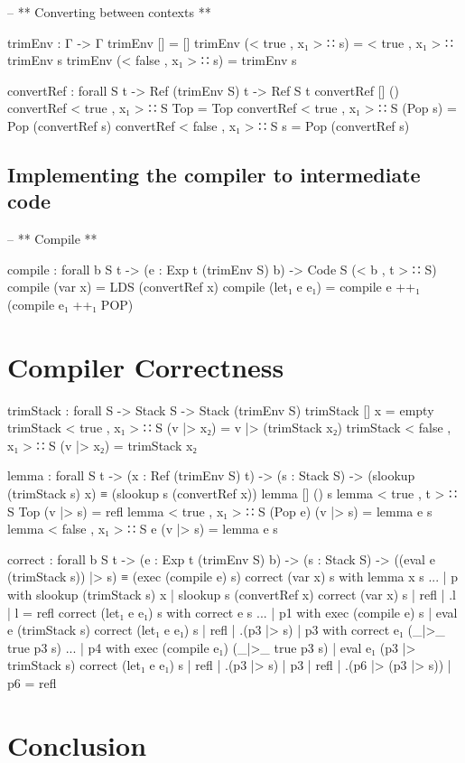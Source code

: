 \documentclass[paper=a4, fontsize=11pt]{scrartcl} %
\numberwithin{equation}{section} %
\numberwithin{figure}{section} %
\numberwithin{table}{section} %
\begin{document}
-- ** Converting between contexts **

trimEnv : Γ -> Γ
trimEnv [] = []
trimEnv (< true , x₁ > ∷ s) = < true , x₁ > ∷ trimEnv s
trimEnv (< false , x₁ > ∷ s) = trimEnv s

convertRef : forall {S t} -> Ref (trimEnv S) t -> Ref S t
convertRef {[]} ()
convertRef {< true , x₁ > ∷ S} Top = Top
convertRef {< true , x₁ > ∷ S} (Pop s) = Pop (convertRef s)
convertRef {< false , x₁ > ∷ S} s = Pop (convertRef s)


\subsection{Implementing the compiler to intermediate code}

-- ** Compile ** 

compile : forall {b S t} -> (e : Exp t (trimEnv S) b) -> Code S (< b , t > ∷ S)
compile (var x) = LDS (convertRef x)
compile (let₁ e e₁) = compile e ++₁ (compile e₁ ++₁ POP)


\section{Compiler Correctness}

trimStack : forall {S} -> Stack S -> Stack (trimEnv S)
trimStack {[]} x = empty
trimStack {< true , x₁ > ∷ S} (v |> x₂) = v |> (trimStack x₂)
trimStack {< false , x₁ > ∷ S} (v |> x₂) = trimStack x₂


lemma : forall {S t} -> (x : Ref (trimEnv S) t) -> (s : Stack S) -> (slookup (trimStack s) x) ≡ (slookup s (convertRef x))
lemma {[]} () s
lemma {< true , t > ∷ S} Top (v |> s) = refl
lemma {< true , x₁ > ∷ S} (Pop e) (v |> s) = lemma e s
lemma {< false , x₁ > ∷ S} e (v |> s) = lemma e s

correct : forall {b S t} -> (e : Exp t (trimEnv S) b) -> (s : Stack S) -> ((eval e (trimStack s)) |> s) ≡ (exec (compile e) s)
correct (var x) s with lemma x s
... | p with slookup (trimStack s) x | slookup s (convertRef x) 
correct (var x) s | refl | .l | l = refl
correct (let₁ e e₁) s with correct e s
... | p1 with exec (compile e) s | eval e (trimStack s)
correct (let₁ e e₁) s | refl | .(p3 |> s) | p3 with correct e₁ (_|>_ {true} p3 s)
... | p4 with exec (compile e₁) (_|>_ {true} p3 s) | eval e₁ (p3 |> trimStack s)
correct (let₁ e e₁) s | refl | .(p3 |> s) | p3 | refl | .(p6 |> (p3 |> s)) | p6 = refl


\section{Conclusion}
\end{document}
